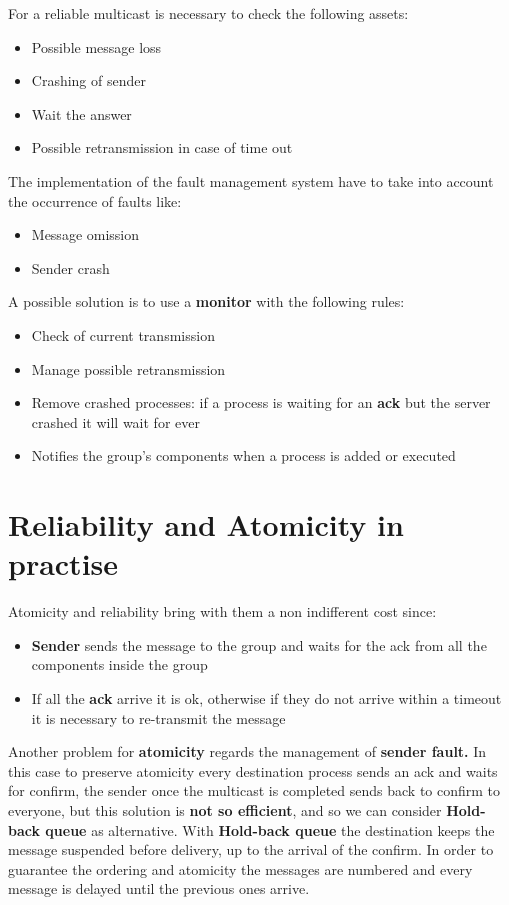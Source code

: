 For a reliable multicast is necessary to check the following assets:
\begin{itemize}
    \item Possible message loss
    \item Crashing of sender
    \item Wait the answer
    \item Possible retransmission in case of time out
\end{itemize}
The implementation of the fault management system have to take into account the occurrence of faults like:
\begin{itemize}
    \item Message omission
    \item Sender crash
\end{itemize}
A possible solution is to use a \textbf{monitor} with the following rules:
\begin{itemize}
    \item Check of current transmission
    \item Manage possible retransmission
    \item Remove crashed processes: if a process is waiting for an \textbf{ack}  but the server crashed it will wait for ever
    \item Notifies the group’s components when a process is added or executed
\end{itemize}

\section{Reliability and Atomicity in practise}
Atomicity and reliability bring with them a non indifferent cost since:
\begin{itemize}
    \item \textbf{Sender} sends the message to the group and waits for the ack from all the components inside the group
    \item If all the \textbf{ack} arrive it is ok, otherwise if they do not arrive within a timeout it is necessary to re-transmit the message
\end{itemize}
Another problem for \textbf{atomicity} regards the management of \textbf{sender fault.} 
In this case to preserve atomicity every destination process sends an ack and waits for confirm, the sender once the multicast is completed sends back to confirm to everyone, but this solution is \textbf{not so efficient}, and so we can consider \textbf{Hold-back queue} as alternative.
With \textbf{Hold-back queue} the destination keeps the message suspended before delivery, up to the arrival of the confirm. In order to guarantee the ordering and atomicity the messages are numbered and every message is delayed until the previous ones arrive.

